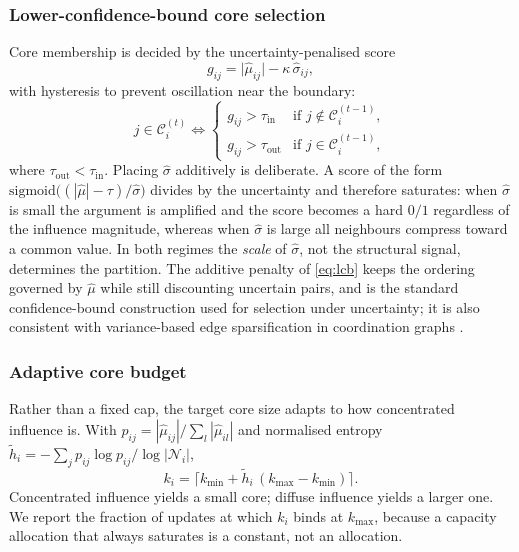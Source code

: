\documentclass[conference]{IEEEtran}
\begin{document}
\subsubsection{Lower-confidence-bound core selection}
Core membership is decided by the uncertainty-penalised score
\begin{equation}
g_{ij}=\big|\hat\mu_{ij}\big|-\kappa\,\hat\sigma_{ij},
\label{eq:lcb}
\end{equation}
with hysteresis to prevent oscillation near the boundary:
\begin{equation}
j\in\mathcal{C}^{(t)}_i \iff
\begin{cases}
g_{ij}>\tau_{\mathrm{in}} & \text{if } j\notin\mathcal{C}^{(t-1)}_i,\\[2pt]
g_{ij}>\tau_{\mathrm{out}} & \text{if } j\in\mathcal{C}^{(t-1)}_i,
\end{cases}
\label{eq:hysteresis}
\end{equation}
where $\tau_{\mathrm{out}}<\tau_{\mathrm{in}}$. Placing $\hat\sigma$ additively is deliberate. A score of the form $\mathrm{sigmoid}\big((|\hat\mu|-\tau)/\hat\sigma\big)$ divides by the uncertainty and therefore saturates: when $\hat\sigma$ is small the argument is amplified and the score becomes a hard $0/1$ regardless of the influence magnitude, whereas when $\hat\sigma$ is large all neighbours compress toward a common value. In both regimes the \emph{scale} of $\hat\sigma$, not the structural signal, determines the partition. The additive penalty of \eqref{eq:lcb} keeps the ordering governed by $\hat\mu$ while still discounting uncertain pairs, and is the standard confidence-bound construction used for selection under uncertainty; it is also consistent with variance-based edge sparsification in coordination graphs \cite{wang2022casec}.

\subsubsection{Adaptive core budget}
Rather than a fixed cap, the target core size adapts to how concentrated influence is. With $p_{ij}=|\hat\mu_{ij}|/\sum_{l}|\hat\mu_{il}|$ and normalised entropy $\tilde{h}_i=-\sum_j p_{ij}\log p_{ij}/\log|\mathcal{N}_i|$,
\begin{equation}
k_i=\big\lceil k_{\min}+\tilde{h}_i\,(k_{\max}-k_{\min}) \big\rceil .
\label{eq:budget}
\end{equation}
Concentrated influence yields a small core; diffuse influence yields a larger one. We report the fraction of updates at which $k_i$ binds at $k_{\max}$, because a capacity allocation that always saturates is a constant, not an allocation.
\end{document}

